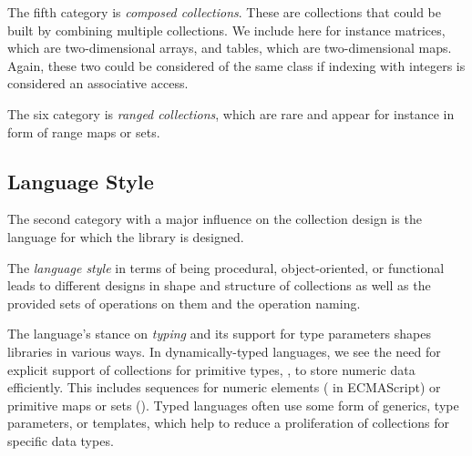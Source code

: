 \documentclass[sigconf, authorversion]{acmart}
\begin{document}
The fifth category is \emph{composed collections}.
These are collections that could be built by combining multiple collections.
We include here for instance matrices, which are two-dimensional arrays,
and tables, which are two-dimensional maps.
Again, these two could be considered of the same class
if indexing with integers is considered an associative access.

The six category is \emph{ranged collections},
which are rare and appear for instance in form of range maps or sets.

\subsection{Language Style}
\label{sec:language-style}

The second category with a major influence on the collection design
is the language for which the library is designed.

The \emph{language style} in terms of being procedural, object-oriented,
or functional leads to different designs in shape and structure of collections
as well as the provided sets of operations on them and the operation naming.

The language's stance on \emph{typing} and its support for type parameters
shapes libraries in various ways.
In dynamically-typed languages,
we see the need for explicit support of collections for primitive types, \eg,
to store numeric data efficiently.
This includes sequences for numeric elements (\eg {} in ECMAScript)
or primitive maps or sets (\eg {}).
Typed languages often use some form of generics, type parameters, or templates,
which help to reduce a proliferation of collections for specific data types.
\end{document}
